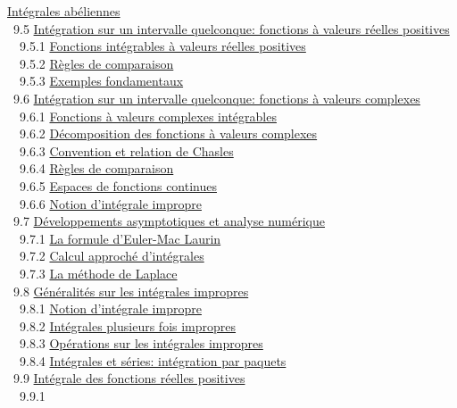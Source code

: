 \documentclass[]{article}
\begin{document}
\href{coursse53.html\#x65-2860009.4.7}{Intégrales abéliennes} \\ ~9.5
\href{coursse54.html\#x66-2870009.5}{Intégration sur un intervalle
quelconque: fonctions à valeurs réelles positives} \\ ~~9.5.1
\href{coursse54.html\#x66-2880009.5.1}{Fonctions intégrables à valeurs
réelles positives} \\ ~~9.5.2
\href{coursse54.html\#x66-2890009.5.2}{Règles de comparaison} \\ ~~9.5.3
\href{coursse54.html\#x66-2900009.5.3}{Exemples fondamentaux} \\ ~9.6
\href{coursse55.html\#x67-2910009.6}{Intégration sur un intervalle
quelconque: fonctions à valeurs complexes} \\ ~~9.6.1
\href{coursse55.html\#x67-2920009.6.1}{Fonctions à valeurs complexes
intégrables} \\ ~~9.6.2
\href{coursse55.html\#x67-2930009.6.2}{Décomposition des fonctions à
valeurs complexes} \\ ~~9.6.3
\href{coursse55.html\#x67-2940009.6.3}{Convention et relation de
Chasles} \\ ~~9.6.4 \href{coursse55.html\#x67-2950009.6.4}{Règles de
comparaison} \\ ~~9.6.5 \href{coursse55.html\#x67-2960009.6.5}{Espaces
de fonctions continues} \\ ~~9.6.6
\href{coursse55.html\#x67-2970009.6.6}{Notion d'intégrale impropre} \\
~9.7 \href{coursse56.html\#x68-2980009.7}{Développements asymptotiques
et analyse numérique} \\ ~~9.7.1
\href{coursse56.html\#x68-2990009.7.1}{La formule d'Euler-Mac Laurin} \\
~~9.7.2 \href{coursse56.html\#x68-3000009.7.2}{Calcul approché
d'intégrales} \\ ~~9.7.3 \href{coursse56.html\#x68-3010009.7.3}{La
méthode de Laplace} \\ ~9.8
\href{coursse57.html\#x69-3020009.8}{Généralités sur les intégrales
impropres} \\ ~~9.8.1 \href{coursse57.html\#x69-3030009.8.1}{Notion
d'intégrale impropre} \\ ~~9.8.2
\href{coursse57.html\#x69-3040009.8.2}{Intégrales plusieurs fois
impropres} \\ ~~9.8.3 \href{coursse57.html\#x69-3050009.8.3}{Opérations
sur les intégrales impropres} \\ ~~9.8.4
\href{coursse57.html\#x69-3060009.8.4}{Intégrales et séries: intégration
par paquets} \\ ~9.9 \href{coursse58.html\#x70-3070009.9}{Intégrale des
fonctions réelles positives} \\ ~~9.9.1
\end{document}
